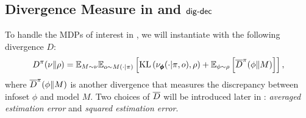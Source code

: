 \subsection{Divergence Measure in  and $\mathsf{dig}\text{-}\mathsf{dec}$}
To handle the MDPs of interest in , we will instantiate  with the following divergence $D$: 
\begin{align}
    D^\pi(\nu\|\rho) = \mathbb{E}_{M \sim \nu}\mathbb{E}_{o \sim M(\cdot|\pi)}\left[\text{KL}\left(\nu_{\pmb{\phi}}(\cdot|\pi, o), \rho\right) + \mathbb{E}_{\phi\sim \rho}\left[\overline{D}^\pi(\phi\|M)\right]\right], \label{eq: our divergence}
\end{align}
where $\overline{D}^\pi(\phi\|M)$ is another divergence that measures the discrepancy between infoset $\phi$ and model $M$. Two choices of $\overline{D}$ will be introduced later in : \emph{averaged estimation error} and \emph{squared estimation error}. %

